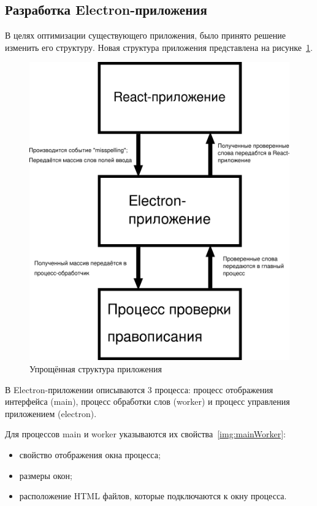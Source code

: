 \subsection{Разработка Electron-приложения}

В целях оптимизации существующего приложения, было принято решение изменить его структуру. Новая структура приложения представлена на рисунке~\ref{img:minStruct}.

\begin{figure}[H]
  \centering
  \includegraphics[height=0.3\textheight]{assets/images/practical/struct.png}
  \caption{Упрощённая структура приложения}
  \label{img:minStruct}
\end{figure}

В Electron-приложении описываются 3 процесса: процесс отображения интерфейса (main), процесс обработки слов (worker) и процесс управления приложением (electron).

Для процессов main и worker указываются их свойства~\ref{img:mainWorker}:

\begin{itemize}
  \item свойство отображения окна процесса;
  \item размеры окон;
  \item расположение HTML файлов, которые подключаются к окну процесса.
\end{itemize}

